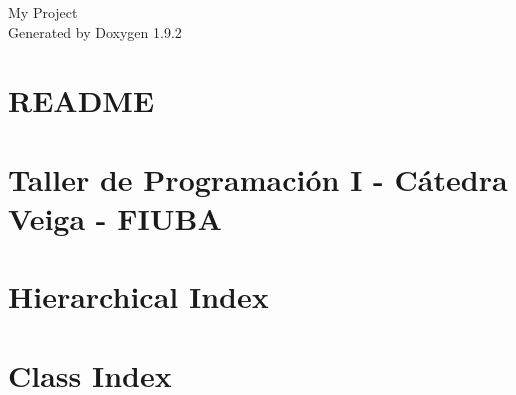 \documentclass[twoside]{book}
\newcommand{\+}{\discretionary{\mbox{\scriptsize$\hookleftarrow$}}{}{}}
\newcommand{\clearemptydoublepage}{%
    \newpage{\pagestyle{empty}\cleardoublepage}%
  }
\begin{document}
  \raggedbottom
    \hypersetup{pageanchor=false,
                bookmarksnumbered=true,
                pdfencoding=unicode
               }
  \begin{titlepage}
  \vspace*{7cm}
  \begin{center}%
  {\Large My Project}\\
  \vspace*{1cm}
  {\large Generated by Doxygen 1.9.2}\\
  \end{center}
  \end{titlepage}
  \clearemptydoublepage
  \tableofcontents
  \clearemptydoublepage
  \hypersetup{pageanchor=true}
\chapter{README}
\label{md_client_README}

\chapter{Taller de Programación I -\/ Cátedra Veiga -\/ FIUBA}
\label{md_README}

\chapter{Hierarchical Index}

\chapter{Class Index}

\end{document}

